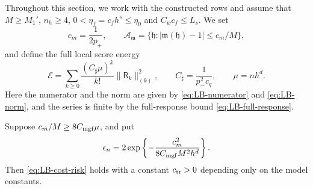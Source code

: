 Throughout this section, we work with the constructed rows and assume
that $M\ge M_1'$, $n_h\ge4$, $0<\eta_f=c_fh^s\le\eta_0$ and
$C_wc_f\le L_s$. We set
\begin{equation}\label{eq:LB-priors-constants}
 c_m=\frac1{2p_+},\qquad
 \mathcal A_{\mathfrak m}
 =\{\mathfrak h:|\mathfrak m(\mathfrak h)-1|\le c_m/M\},
\end{equation}
and define the full local score energy
\begin{equation}\label{eq:LB-score-energy}
 \mathcal E=\sum_{k\ge0}\frac{(C_\sharp\mu)^k}{k!}
                         \|\mathsf R_k\|_{(k)}^2,
 \qquad C_\sharp=\frac1{p_-^2c_q},\qquad \mu=nh^d.
\end{equation}
Here the numerator and the norm are given by \eqref{eq:LB-numerator}
and \eqref{eq:LB-norm}, and the series is finite by the full-response
bound \eqref{eq:LB-full-response}.

\begin{proposition}\label{lem:score-risk}
Suppose $c_m/M\ge8C_{\rm mgf}\mu$, and put
\begin{equation}\label{eq:LB-bad-mass}
 \epsilon_n=2\exp\left\{-\frac{c_m^2}{8C_{\rm mgf}M^2h^d}\right\}.
\end{equation}
Then \eqref{eq:LB-cost-risk} holds with a constant $c_{\rm tr}>0$
depending only on the model constants.
\end{proposition}

